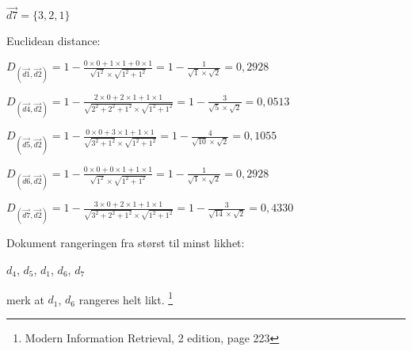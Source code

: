 \documentclass[]{article}
\begin{document}
\indent\indent$\overrightarrow{d7} = \{3,2,1\}$

\vspace{10 mm}

Euclidean distance:
\vspace{2 mm}
 	
$D_{(\overrightarrow{d1},\overrightarrow{d2})} = 1- \frac{0\times0+1\times1+0\times1}{\sqrt{1^2}\times\sqrt{1^2+1^2}} = 1 - \frac{1}{\sqrt{1}\times\sqrt{2}} = 0,2928$
\vspace{2 mm}

$D_{(\overrightarrow{d4},\overrightarrow{d2})} = 1 - \frac{2\times0+2\times1+1\times1}{\sqrt{2^2+2^2+1^2}\times\sqrt{1^2+1^2}} = 1 - \frac{3}{\sqrt{5}\times\sqrt{2}} = 0,0513$
\vspace{2 mm}

$D_{(\overrightarrow{d5},\overrightarrow{d2})} = 1 - \frac{0\times0+3\times1+1\times1}{\sqrt{3^2+1^2}\times\sqrt{1^2+1^2}} = 1 - \frac{4}{\sqrt{10}\times\sqrt{2}} = 0,1055$
\vspace{2 mm}

$D_{(\overrightarrow{d6},\overrightarrow{d2})} = 1 - \frac{0\times0+0\times1+1\times1}{\sqrt{1^2}\times\sqrt{1^2 + 1^2}} = 1 - \frac{1}{\sqrt{1}\times\sqrt{2}} = 0,2928$
\vspace{2 mm}

$D_{(\overrightarrow{d7},\overrightarrow{d2})} = 1 - \frac{3\times0+2\times1+1\times1}{\sqrt{3^2+2^2+1^2}\times\sqrt{1^2+1^2}} = 1 - \frac{3}{\sqrt{14}\times\sqrt{2}} = 0,4330$
\vspace{10 mm}

Dokument rangeringen fra størst til minst likhet:
\vspace{2 mm}

\indent\indent$d_4$, $d_5$, $d_1$, $d_6$, $d_7$
\vspace{1 mm}

\indent\indent merk at $d_1$, $d_6$ rangeres helt likt.
\vspace{20 mm}
\let\thefootnote\relax\footnote{Modern Information Retrieval, 2 edition, page 223}
\end{document}
